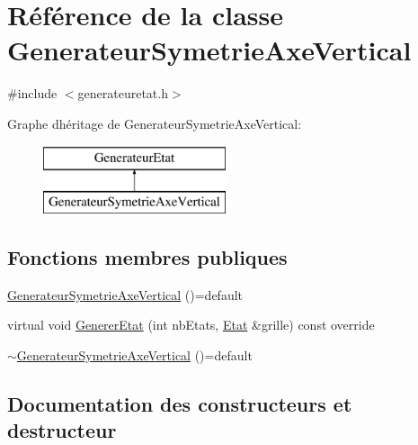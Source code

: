 \hypertarget{class_generateur_symetrie_axe_vertical}{}\section{Référence de la classe Generateur\+Symetrie\+Axe\+Vertical}
\label{class_generateur_symetrie_axe_vertical}


{\ttfamily \#include $<$generateuretat.\+h$>$}

Graphe d\textquotesingle{}héritage de Generateur\+Symetrie\+Axe\+Vertical\+:\begin{figure}[H]
\begin{center}
\leavevmode
\includegraphics[height=2.000000cm]{class_generateur_symetrie_axe_vertical}
\end{center}
\end{figure}
\subsection*{Fonctions membres publiques}
\begin{DoxyCompactItemize}
\item 
\mbox{\hyperlink{class_generateur_symetrie_axe_vertical_a5e7ad0b4e452fe6a96ad75e5b54492f2}{Generateur\+Symetrie\+Axe\+Vertical}} ()=default
\item 
virtual void \mbox{\hyperlink{class_generateur_symetrie_axe_vertical_ae782046a73fc7624212c3c5988de949f}{Generer\+Etat}} (int nb\+Etats, \mbox{\hyperlink{class_etat}{Etat}} \&grille) const override
\item 
\mbox{\hyperlink{class_generateur_symetrie_axe_vertical_ae2a3a066dba020c68a91739956fb01ac}{$\sim$\+Generateur\+Symetrie\+Axe\+Vertical}} ()=default
\end{DoxyCompactItemize}


\subsection{Documentation des constructeurs et destructeur}
\mbox{\label{class_generateur_symetrie_axe_vertical_a5e7ad0b4e452fe6a96ad75e5b54492f2}} 
